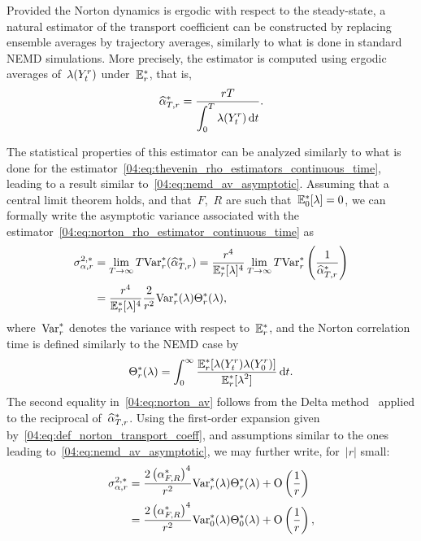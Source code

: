 Provided the Norton dynamics is ergodic with respect to the steady-state, a natural estimator of the transport coefficient can be constructed by replacing ensemble averages by trajectory averages, similarly to what is done in standard NEMD simulations. More precisely, the estimator is computed using ergodic averages of~$\lambda(Y^r_t)$ under~$\mathbb{E}_r^*$,
that is,
\begin{equation}
\label{04:eq:norton_rho_estimator_continuous_time}
    \widehat{\alpha}_{T,r}^*= \frac{rT}{\displaystyle{\int_{0}^T \lambda(Y_t^r)\,\mathrm{d}t}}.
\end{equation}

The statistical properties of this estimator can be analyzed similarly to what is done for the estimator~\eqref{04:eq:thevenin_rho_estimators_continuous_time}, leading to a result similar to~\eqref{04:eq:nemd_av_asymptotic}.
Assuming that a central limit theorem holds, and that~$F$,~$R$ are such that~$\mathbb{E}_0^*[\lambda]=0$, we can formally write the asymptotic variance associated with the estimator~\eqref{04:eq:norton_rho_estimator_continuous_time} as
\begin{equation}
    \label{04:eq:norton_av}
    \begin{aligned}
    \sigma_{\alpha,r}^{2,*} &= \lim_{T\to \infty} T\mathrm{Var}^*_r(\widehat{\alpha}_{T,r}^*)
     = \frac{r^4}{\mathbb{E}_{r}^*[\lambda]^4}\lim_{T\to \infty} T\mathrm{Var}^*_r\left(\frac{1}{\widehat{\alpha}_{T,r}^*}\right)\\
    & = \frac{r^4}{\mathbb{E}_{r}^*[\lambda]^4}\frac{2}{r^2}\mathrm{Var}_r^*(\lambda)\Theta_r^*(\lambda),
        \end{aligned}
\end{equation}
where~$\mathrm{Var}_r^*$ denotes the variance with respect to~$\mathbb{E}_r^*$, and the Norton correlation time is defined similarly to the NEMD case by 
\begin{equation}
    \label{04:eq:norton_correlation_time}
    \Theta_{r}^*(\lambda) = \int_{0}^\infty \frac{\displaystyle{\mathbb{E}_r^*[\lambda(Y_t^r)\lambda(Y_0^r)]}}{\displaystyle{\mathbb{E}_r^*[\lambda^2]}}\,\mathrm{d} t.
\end{equation}
The second equality in~\eqref{04:eq:norton_av} follows from the Delta method~\cite[Chapter 3]{VDV00} applied to the reciprocal of~$\widehat{\alpha}_{T,r}^*$. Using the first-order expansion given by~\eqref{04:eq:def_norton_transport_coeff}, and assumptions similar to the ones leading to~\eqref{04:eq:nemd_av_asymptotic}, we may further write, for~$|r|$ small:
\begin{equation*}
    \begin{aligned}
            \sigma_{\alpha,r}^{2,*} &= \frac{2\left(\alpha_{F,R}^{*}\right)^4}{r^2}\mathrm{Var}_r^*(\lambda)\Theta_r^*(\lambda) + \mathrm{O}\left(\frac1r\right)\\
    &= \frac{2\left(\alpha_{F,R}^{*}\right)^4}{r^2}\mathrm{Var}_0^*(\lambda)\Theta_0^*(\lambda) + \mathrm{O}\left(\frac1r\right),
    \end{aligned}
\end{equation*}


